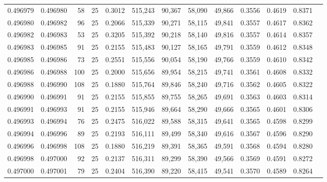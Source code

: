 \begin{tabular}{rrrrrrrrrrrrr}
0.496979 & 0.496980 &    58 &  25 &                                     0.3012 & 515,243 &  90,367 &  58,090 &  49,866 & 0.3556 & 0.4619 & 0.8371 \\
0.496980 & 0.496982 &    96 &  25 &                                     0.2066 & 515,339 &  90,271 &  58,115 &  49,841 & 0.3557 & 0.4617 & 0.8362 \\
0.496982 & 0.496983 &    53 &  25 &                                     0.3205 & 515,392 &  90,218 &  58,140 &  49,816 & 0.3557 & 0.4614 & 0.8357 \\
0.496983 & 0.496985 &    91 &  25 &                                     0.2155 & 515,483 &  90,127 &  58,165 &  49,791 & 0.3559 & 0.4612 & 0.8348 \\
0.496985 & 0.496986 &    73 &  25 &                                     0.2551 & 515,556 &  90,054 &  58,190 &  49,766 & 0.3559 & 0.4610 & 0.8342 \\
0.496986 & 0.496988 &   100 &  25 &                                     0.2000 & 515,656 &  89,954 &  58,215 &  49,741 & 0.3561 & 0.4608 & 0.8332 \\
0.496988 & 0.496990 &   108 &  25 &                                     0.1880 & 515,764 &  89,846 &  58,240 &  49,716 & 0.3562 & 0.4605 & 0.8322 \\
0.496990 & 0.496991 &    91 &  25 &                                     0.2155 & 515,855 &  89,755 &  58,265 &  49,691 & 0.3563 & 0.4603 & 0.8314 \\
0.496991 & 0.496993 &    91 &  25 &                                     0.2155 & 515,946 &  89,664 &  58,290 &  49,666 & 0.3565 & 0.4601 & 0.8306 \\
0.496993 & 0.496994 &    76 &  25 &                                     0.2475 & 516,022 &  89,588 &  58,315 &  49,641 & 0.3565 & 0.4598 & 0.8299 \\
0.496994 & 0.496996 &    89 &  25 &                                     0.2193 & 516,111 &  89,499 &  58,340 &  49,616 & 0.3567 & 0.4596 & 0.8290 \\
0.496996 & 0.496998 &   108 &  25 &                                     0.1880 & 516,219 &  89,391 &  58,365 &  49,591 & 0.3568 & 0.4594 & 0.8280 \\
0.496998 & 0.497000 &    92 &  25 &                                     0.2137 & 516,311 &  89,299 &  58,390 &  49,566 & 0.3569 & 0.4591 & 0.8272 \\
0.497000 & 0.497001 &    79 &  25 &                                     0.2404 & 516,390 &  89,220 &  58,415 &  49,541 & 0.3570 & 0.4589 & 0.8264 \\

\end{tabular}
